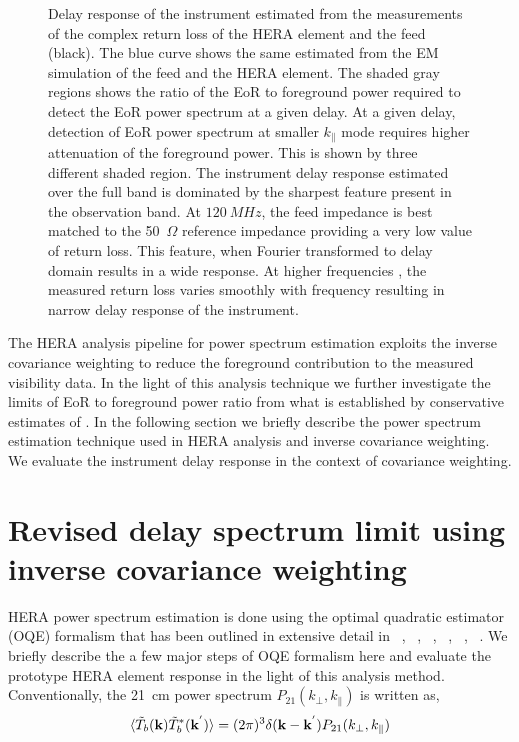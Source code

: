 \documentclass[twocolumn]{emulateapj}
\begin{document}
\begin{figure}[ht]
    \caption{Delay response of the instrument estimated from the measurements of the complex return loss of the HERA element and the feed (black). The blue curve shows the same estimated from the EM simulation of the feed and the HERA element. The shaded gray regions shows the ratio of the EoR to foreground power required to detect the EoR power spectrum at a given delay. At a given delay, detection of EoR power spectrum at smaller $k_{\parallel}$ mode requires higher attenuation of the foreground power. This is shown by three different shaded region. The instrument delay response estimated over the full band is dominated by the sharpest feature present in the observation band. At $120~MHz$, the feed impedance is best matched to the 50~$\Omega$ reference impedance providing a very low value of return loss. This feature, when Fourier transformed to delay domain results in a wide response.  At higher frequencies , the measured return loss varies smoothly with frequency resulting in narrow delay response of the instrument. }   
    \label{ds_full_sub_band}
    \end{figure}
 The HERA analysis pipeline for power spectrum estimation exploits the inverse covariance weighting to reduce the foreground contribution to the measured visibility data. In the light of this analysis technique we further investigate the limits of EoR to foreground power ratio from what is established by conservative estimates of \cite{Thyagarajan_et_al2016}. In the following section we briefly describe the power spectrum estimation technique used in HERA analysis and inverse covariance weighting. We evaluate the instrument delay response in the context of covariance weighting.

   \section{\textbf{Revised delay spectrum limit using inverse covariance weighting}}    
    
    HERA power spectrum estimation is done using the optimal quadratic estimator
    (OQE) formalism that has been outlined in extensive detail in  ~\cite{liu_et_al2010}, ~\cite{dillon_et_al2013a}, ~\cite{liu_et_al2014a}, ~\cite{liu_et_al2014b}, ~\cite{trott_et_al2012}, ~\cite{Ali_et_al2015}. We briefly  describe the a few major steps of OQE formalism here and evaluate the prototype HERA element response in the light of this analysis method.
    Conventionally, the 21~cm power spectrum $P_{21}(k_\perp,k_\parallel)$ is written as, 
    \begin{equation}
    \langle  \tilde T_{b}(\bold k) \tilde T_{b}^{*}(\bold k^{'}) \rangle = (2\pi)^{3} \delta (\bold k - \bold k^{'})P_{21}(k_\perp,k_\parallel)
    \label{eq14}
    \end{equation}
    
\end{document}
